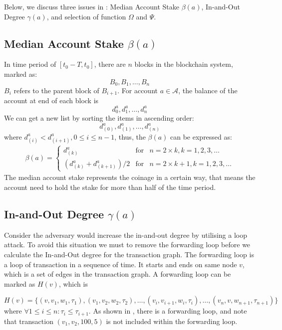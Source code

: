 Below, we discuss three issues in : Median Account Stake $\beta(a)$, In-and-Out Degree $\gamma(a)$, and selection of function $\Omega$ and $\Psi$.

\subsection{Median Account Stake $\beta(a)$}
In time period of $[t_0-T, t_0]$, there are $n$ blocks in the blockchain system, marked as:
\[
B_0, B_1, \dots, B_n
\]
\noindent $B_{i}$ refers to the parent block of $B_{i+1}$. For account $a \in \mathcal{A}$, the balance of the account at end of each block is
\[
d^a_0, d^a_1, \dots, d^a_n
\]
We can get a new list by sorting the items in ascending order:
\[
d^a_{(0)}, d^a_{(1)}, \dots, d^a_{(n)}
\]
\noindent where $d^a_{(i)} < d^a_{(i+1)}, 0\le i \le {n-1}$, thus, the $\beta(a)$ can be expressed as:
\begin{align}
\beta(a) = \left\{ \begin{array}{rcl}
{d^a_{(k)}} & \mbox{for} & n=2\times{}k, k=1, 2, 3, \ldots \\
{(d^a_{(k)} + d^a_{(k+1)})/2} & \mbox{for} & n=2\times{}k + 1, k=1, 2, 3, \ldots
\end{array}\right.
\end{align}
The median account stake represents the coinage in a certain way, that means the account need to hold the stake for more than half of the time period.

\subsection{In-and-Out Degree $\gamma(a)$}
Consider the adversary would increase the in-and-out degree by utilising a loop attack. To avoid this situation we must to remove the forwarding loop before we calculate the In-and-Out degree for the transaction graph. The forwarding loop is a loop of transaction in a sequence of time.
It starts and ends on same node $v$, which is a set of edges in the transaction graph. A forwarding loop can be marked as $H(v)$, which is

\[
H(v) = \{(v, v_1, w_1, \tau_1), (v_1, v_2, w_2, \tau_2), \dots, (v_i, v_{i+1}, w_{i}, \tau_i), \dots, (v_n, v, w_{n+1}, \tau_{n+1})\}
\]
\noindent where $\forall 1\le i \le n : \tau_i \le \tau_{i+1} $.
\noindent As shown in , there is a forwarding loop, and note that transaction $(v_1, v_2, 100, 5)$ is not included within the forwarding loop.

